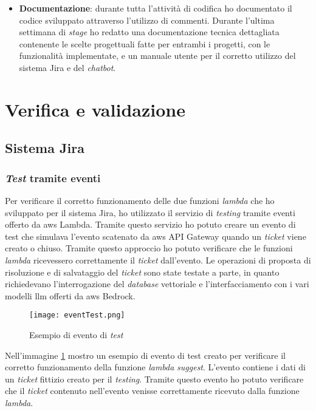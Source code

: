 \begin{itemize}
    \item \textbf{Documentazione}: durante tutta l'attività di codifica ho documentato il codice sviluppato attraverso l'utilizzo di commenti. Durante l'ultima settimana di \textit{stage} ho redatto una documentazione tecnica dettagliata contenente le scelte progettuali fatte per entrambi i progetti, con le funzionalità implementate, e un manuale utente per il corretto utilizzo del sistema Jira e del \textit{chatbot}. 
\end{itemize}

\section{Verifica e validazione}
\subsection{Sistema Jira}
\subsubsection{\textit{Test} tramite eventi}
Per verificare il corretto funzionamento delle due funzioni \textit{lambda} che ho sviluppato per il sistema Jira, ho utilizzato il servizio di \textit{testing} tramite eventi offerto da \gls{aws} Lambda. Tramite questo servizio ho potuto creare un evento di test che simulava l'evento scatenato da \gls{aws} API Gateway quando un \textit{ticket} viene creato o chiuso. Tramite questo approccio ho potuto verificare che le funzioni \textit{lambda} ricevessero correttamente il \textit{ticket} dall'evento. Le operazioni di proposta di risoluzione e di salvataggio del \textit{ticket} sono state testate a parte, in quanto richiedevano l'interrogazione del \textit{database} vettoriale e l'interfacciamento con i vari modelli \gls{llm} offerti da \gls{aws} Bedrock. 
\begin{figure}[H]
    \centering
    \texttt{[image: eventTest.png]}
    \caption{Esempio di evento di \textit{test}}
    \label{fig:testLambda}
\end{figure}
\noindent
Nell'immagine \ref{fig:testLambda} mostro un esempio di evento di test creato per verificare il corretto funzionamento della funzione \textit{lambda} \textit{suggest}. L'evento contiene i dati di un \textit{ticket} fittizio creato per il \textit{testing}. Tramite questo evento ho potuto verificare che il \textit{ticket} contenuto nell'evento venisse correttamente ricevuto dalla funzione \textit{lambda}.

